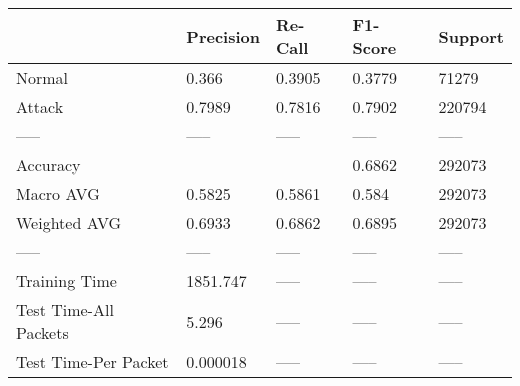 \begin{tabular}{lllll}
\toprule
{} & Precision & Re-Call & F1-Score & Support \\
\midrule
Normal                &     0.366 &  0.3905 &   0.3779 &   71279 \\
Attack                &    0.7989 &  0.7816 &   0.7902 &  220794 \\
-----                 &     ----- &   ----- &    ----- &   ----- \\
Accuracy              &           &         &   0.6862 &  292073 \\
Macro AVG             &    0.5825 &  0.5861 &    0.584 &  292073 \\
Weighted AVG          &    0.6933 &  0.6862 &   0.6895 &  292073 \\
-----                 &     ----- &   ----- &    ----- &   ----- \\
Training Time         &  1851.747 &   ----- &    ----- &   ----- \\
Test Time-All Packets &     5.296 &   ----- &    ----- &   ----- \\
Test Time-Per Packet  &  0.000018 &   ----- &    ----- &   ----- \\
\bottomrule
\end{tabular}
